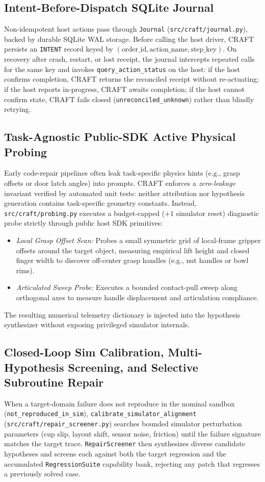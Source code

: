 \documentclass[10pt,journal]{IEEEtran}
\begin{document}
\subsection{Intent-Before-Dispatch SQLite Journal}
Non-idempotent host actions pass through \texttt{Journal} (\texttt{src/craft/journal.py}), backed by durable SQLite WAL storage. Before calling the host driver, CRAFT persists an \texttt{INTENT} record keyed by $(\text{order\_id}, \text{action\_name}, \text{step\_key})$. On recovery after crash, restart, or lost receipt, the journal intercepts repeated calls for the same key and invokes \texttt{query\_action\_status} on the host: if the host confirms completion, CRAFT returns the reconciled receipt without re-actuating; if the host reports in-progress, CRAFT awaits completion; if the host cannot confirm state, CRAFT fails closed (\texttt{unreconciled\_unknown}) rather than blindly retrying.

\subsection{Task-Agnostic Public-SDK Active Physical Probing}
Early code-repair pipelines often leak task-specific physics hints (e.g., grasp offsets or door latch angles) into prompts. CRAFT enforces a \emph{zero-leakage} invariant verified by automated unit tests: neither attribution nor hypothesis generation contains task-specific geometry constants. Instead, \texttt{src/craft/probing.py} executes a budget-capped ($+1$ simulator reset) diagnostic probe strictly through public host SDK primitives:
\begin{itemize}
    \item \emph{Local Grasp Offset Scan:} Probes a small symmetric grid of local-frame gripper offsets around the target object, measuring empirical lift height and closed finger width to discover off-center grasp handles (e.g., nut handles or bowl rims).
    \item \emph{Articulated Sweep Probe:} Executes a bounded contact-pull sweep along orthogonal axes to measure handle displacement and articulation compliance.
\end{itemize}
The resulting numerical telemetry dictionary is injected into the hypothesis synthesizer without exposing privileged simulator internals.

\subsection{Closed-Loop Sim Calibration, Multi-Hypothesis Screening, and Selective Subroutine Repair}
When a target-domain failure does not reproduce in the nominal sandbox (\texttt{not\_reproduced\_in\_sim}), \texttt{calibrate\_simulator\_alignment} (\texttt{src/craft/repair\_screener.py}) searches bounded simulator perturbation parameters (cup slip, layout shift, sensor noise, friction) until the failure signature matches the target trace. \texttt{RepairScreener} then synthesizes diverse candidate hypotheses and screens each against both the target regression and the accumulated \texttt{RegressionSuite} capability bank, rejecting any patch that regresses a previously solved case.
\end{document}

